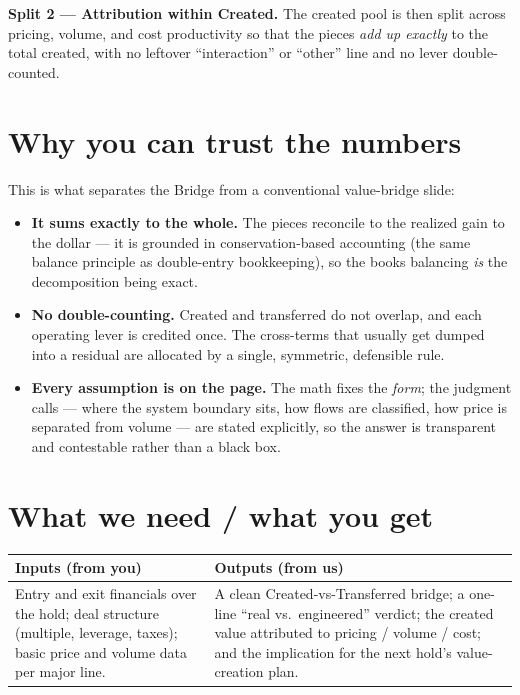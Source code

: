 \documentclass[11pt]{article}
\begin{document}
\smallskip
\textbf{Split 2 --- Attribution within Created.} The created pool is then split across pricing,
volume, and cost productivity so that the pieces \emph{add up exactly} to the total created,
with no leftover ``interaction'' or ``other'' line and no lever double-counted.

\section{Why you can trust the numbers}
This is what separates the Bridge from a conventional value-bridge slide:
\begin{itemize}
  \item \textbf{It sums exactly to the whole.} The pieces reconcile to the realized gain to
  the dollar --- it is grounded in conservation-based accounting (the same balance principle
  as double-entry bookkeeping), so the books balancing \emph{is} the decomposition being
  exact.
  \item \textbf{No double-counting.} Created and transferred do not overlap, and each operating
  lever is credited once. The cross-terms that usually get dumped into a residual are
  allocated by a single, symmetric, defensible rule.
  \item \textbf{Every assumption is on the page.} The math fixes the \emph{form}; the
  judgment calls --- where the system boundary sits, how flows are classified, how price is
  separated from volume --- are stated explicitly, so the answer is transparent and
  contestable rather than a black box.
\end{itemize}

\section{What we need / what you get}
\begin{center}
\renewcommand{\arraystretch}{1.25}\small
\begin{tabular}{p{6.6cm} p{6.6cm}}
\toprule
\textbf{Inputs (from you)} & \textbf{Outputs (from us)} \\
\midrule
Entry and exit financials over the hold; deal structure (multiple, leverage, taxes); basic
price and volume data per major line. &
A clean Created-vs-Transferred bridge; a one-line ``real vs.\ engineered'' verdict; the
created value attributed to pricing / volume / cost; and the implication for the next hold's
value-creation plan. \\
\bottomrule
\end{tabular}
\end{center}
\end{document}
